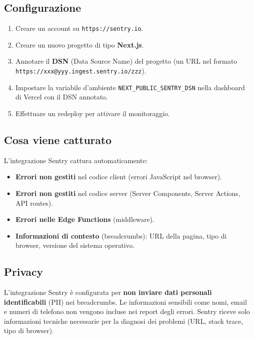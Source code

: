 \documentclass[a4paper,11pt,oneside]{book}
\begin{document}
\subsection{Configurazione}

\begin{enumerate}[leftmargin=1.5em]
  \item Creare un account su \texttt{https://sentry.io}.
  \item Creare un nuovo progetto di tipo \textbf{Next.js}.
  \item Annotare il \textbf{DSN} (Data Source Name) del progetto (un URL nel formato \texttt{https://xxx@yyy.ingest.sentry.io/zzz}).
  \item Impostare la variabile d'ambiente \texttt{NEXT\_PUBLIC\_SENTRY\_DSN} nella dashboard di Vercel con il DSN annotato.
  \item Effettuare un redeploy per attivare il monitoraggio.
\end{enumerate}

\subsection{Cosa viene catturato}

L'integrazione Sentry cattura automaticamente:

\begin{itemize}[leftmargin=1.5em]
  \item \textbf{Errori non gestiti} nel codice client (errori JavaScript nel browser).
  \item \textbf{Errori non gestiti} nel codice server (Server Components, Server Actions, API routes).
  \item \textbf{Errori nelle Edge Functions} (middleware).
  \item \textbf{Informazioni di contesto} (breadcrumbs): URL della pagina, tipo di browser, versione del sistema operativo.
\end{itemize}

\subsection{Privacy}

\begin{infobox}
L'integrazione Sentry \`e configurata per \textbf{non inviare dati personali identificabili} (PII) nei breadcrumbs. Le informazioni sensibili come nomi, email e numeri di telefono non vengono incluse nei report degli errori. Sentry riceve solo informazioni tecniche necessarie per la diagnosi dei problemi (URL, stack trace, tipo di browser).
\end{infobox}
\end{document}
